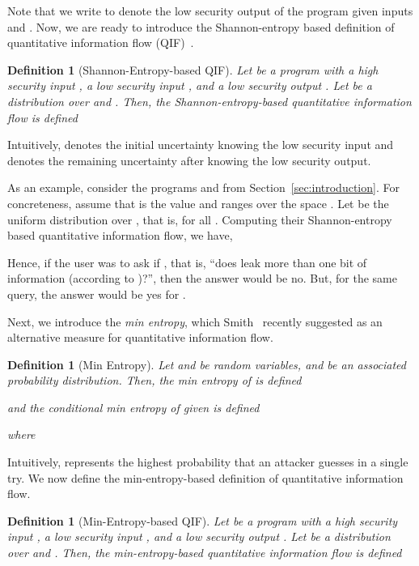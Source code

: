 \documentclass{llncs}
\newtheorem{definition}[theorem]{Definition}
\begin{document}
Note that we write  to denote the low security output of
the program  given inputs  and .  Now, we are ready to
introduce the Shannon-entropy based definition of quantitative
information flow (QIF)~\cite{denning82,clarkjcs2007,malacaria:popl2007}.
\begin{definition}[Shannon-Entropy-based QIF]
\label{def:se}
Let  be a program with a high security input , a low security input
, and a low security output .  Let  be a distribution over
 and .  Then, the Shannon-entropy-based quantitative information
flow is defined

\end{definition}
Intuitively,  denotes the initial uncertainty
knowing the low security input and  denotes
the remaining uncertainty after knowing the low security output.

\begin{sloppypar}
As an example, consider the programs  and  from
Section~\ref{sec:introduction}.  For concreteness, assume that  is
the value  and  ranges over the space .
Let  be the uniform distribution over , that
is,  for all .  Computing
their Shannon-entropy based quantitative information flow, we have,
\end{sloppypar}

Hence, if the user was to ask if , that is,
``does  leak more than one bit of information (according to )?'', then the answer would be no.  But, for the same query,
the answer would be yes for .

Next, we introduce the {\em min entropy}, which Smith~\cite{smith09}
recently suggested as an alternative measure for quantitative information
flow.
\begin{definition}[Min Entropy]
Let  and  be random variables, and  be an associated probability
distribution.  Then, the min entropy of  is defined

and the conditional min entropy of  given  is defined

where

\end{definition}

\begin{sloppypar}
Intuitively,  represents the highest probability
that an attacker guesses  in a single try.  We now define the
min-entropy-based definition of quantitative information flow.
\end{sloppypar}

\begin{definition}[Min-Entropy-based QIF]
\label{def:me}
Let  be a program with a high security input , a low security input
, and a low security output .  Let  be a distribution over
 and .  Then, the min-entropy-based quantitative information
flow is defined

\end{definition}
\end{document}
